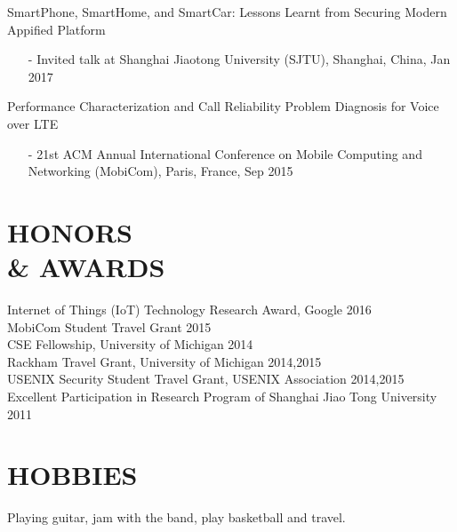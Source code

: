\documentclass[margin]{res}
\begin{document}
\begin{resume}
SmartPhone, SmartHome, and SmartCar: Lessons Learnt from Securing Modern Appified Platform
\begin{itemize}
\item[-] Invited talk at Shanghai Jiaotong University (SJTU), Shanghai, China, Jan 2017
\end{itemize}

Performance Characterization and Call Reliability Problem Diagnosis for Voice over LTE
\begin{itemize}
\item[-] 21st  ACM Annual International Conference on Mobile Computing and Networking (MobiCom), Paris, France, Sep 2015
\end{itemize}

\section{HONORS\\ \& AWARDS}
Internet of Things (IoT) Technology Research Award, Google \hfill 2016\\
MobiCom Student Travel Grant \hfill 2015 \\
CSE Fellowship, University of Michigan \hfill 2014 \\
Rackham Travel Grant, University of Michigan \hfill 2014,2015 \\
USENIX Security Student Travel Grant, USENIX Association \hfill 2014,2015 \\
Excellent Participation in Research Program of Shanghai Jiao Tong University \hfill 2011 \\

\section{HOBBIES}
Playing guitar, jam with the band, play basketball and travel. 
\end{resume}
\end{document}
